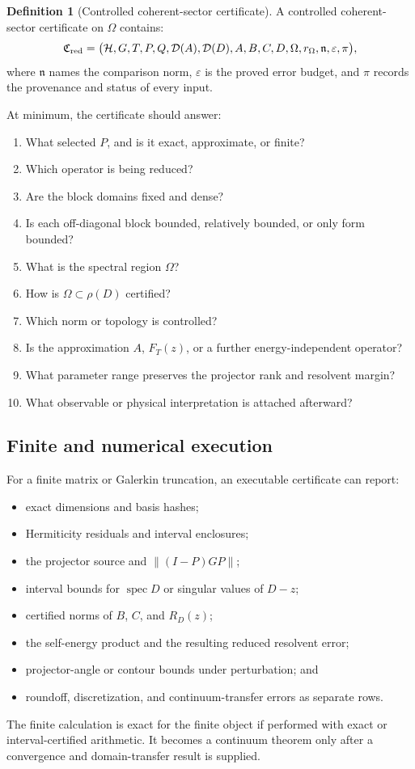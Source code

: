 \documentclass[11pt]{article}
\theoremstyle{definition}
\newtheorem{definition}[theorem]{Definition}
\theoremstyle{remark}
\newcommand{\cD}{\mathcal D}
\newcommand{\cH}{\mathcal H}
\newcommand{\1}{\mathbf 1}
\newcommand{\spec}{\operatorname{spec}}
\begin{document}
\begin{definition}[Controlled coherent-sector certificate]
A controlled coherent-sector certificate on \(\Omega\) contains:
\[
\mathfrak C_{\rm red}
=
\bigl(
\cH,G,T,P,Q,
\cD(A),\cD(D),
A,B,C,D,
\Omega,r_\Omega,
\mathfrak n,\varepsilon,
\pi
\bigr),
\]
where \(\mathfrak n\) names the comparison norm,
\(\varepsilon\) is the proved error budget, and \(\pi\) records the
provenance and status of every input.
\end{definition}

At minimum, the certificate should answer:
\begin{enumerate}[leftmargin=2em]
\item What selected \(P\), and is it exact, approximate, or finite?
\item Which operator is being reduced?
\item Are the block domains fixed and dense?
\item Is each off-diagonal block bounded, relatively bounded, or only
      form bounded?
\item What is the spectral region \(\Omega\)?
\item How is \(\Omega\subset\rho(D)\) certified?
\item Which norm or topology is controlled?
\item Is the approximation \(A\), \(F_T(z)\), or a further
      energy-independent operator?
\item What parameter range preserves the projector rank and resolvent
      margin?
\item What observable or physical interpretation is attached afterward?
\end{enumerate}

\subsection{Finite and numerical execution}

For a finite matrix or Galerkin truncation, an executable certificate can
report:
\begin{itemize}[leftmargin=2em]
\item exact dimensions and basis hashes;
\item Hermiticity residuals and interval enclosures;
\item the projector source and
      \(\|(I-P)GP\|\);
\item interval bounds for \(\spec D\) or singular values of \(D-z\);
\item certified norms of \(B\), \(C\), and \(R_D(z)\);
\item the self-energy product and the resulting reduced resolvent error;
\item projector-angle or contour bounds under perturbation; and
\item roundoff, discretization, and continuum-transfer errors as separate
      rows.
\end{itemize}
The finite calculation is exact for the finite object if performed with
exact or interval-certified arithmetic.  It becomes a continuum theorem
only after a convergence and domain-transfer result is supplied.
\end{document}
